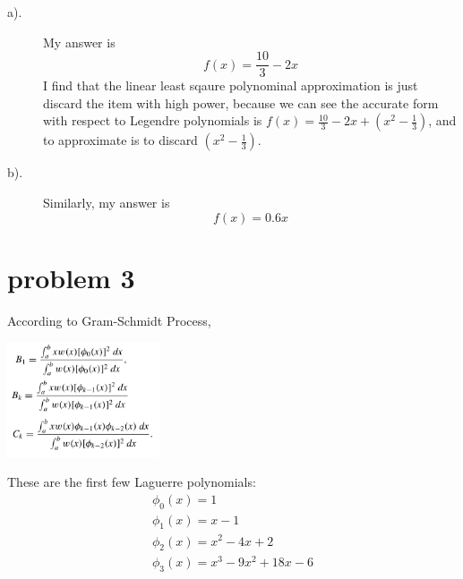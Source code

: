 \documentclass{article}
\begin{document}
\begin{description}
  \item[a).]
  My answer is
  \[f(x)=\frac{10}{3}-2x\]
  I find that the linear least sqaure polynominal approximation is just discard the item with high power, because we can see the accurate form with respect to Legendre polynomials is $f(x)=\frac{10}{3}-2x+(x^2-\frac{1}{3})$, and to approximate is to discard $(x^2-\frac{1}{3})$.
  \item[b).]
  Similarly, my answer is \[ f(x)=0.6x \]
\end{description}

\section{problem 3}
According to Gram-Schmidt Process,
\begin{center}
  \includegraphics[width=4.5cm]{../pic/p3_2.png}
\end{center}
These are the first few Laguerre polynomials:
\[\begin{array}{l}
{\phi_0}(x) = 1\\
{\phi_1}(x) =   x - 1\\
{\phi_2}(x) = {x^2} - 4x + 2\\
{\phi_3}(x) =   {x^3} - 9{x^2} + 18x - 6

\end{array}\]
\end{document}
